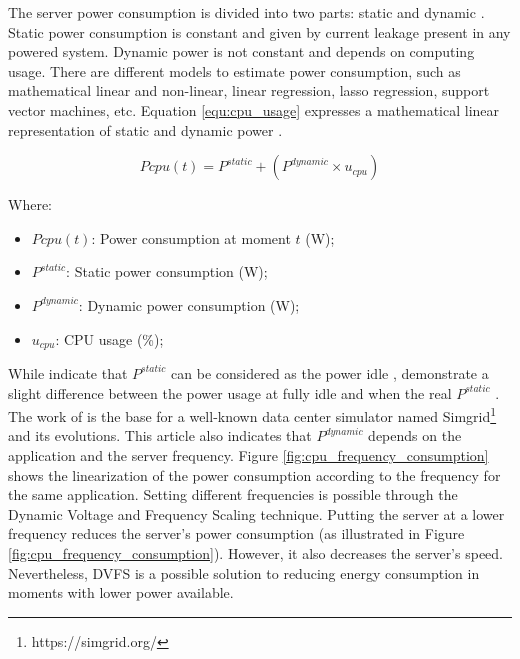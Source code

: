 The server power consumption is divided into two parts: static and dynamic \cite{orgerie2014survey, heinrich2017predicting}. Static power consumption is constant and given by current leakage present in any powered system. Dynamic power is not constant and depends on computing usage. There are different models to estimate power consumption, such as mathematical linear and non-linear, linear regression, lasso regression, support vector machines, etc. Equation \ref{equ:cpu_usage} expresses a mathematical linear representation of static and dynamic power \cite{heinrich2017predicting, ismail2020computing}.

\begin{equation}
    \label{equ:cpu_usage}
    Pcpu(t) = P^{static} + (P^{dynamic} \times u_{cpu})
\end{equation}

Where:
\begin{itemize}
    \item $Pcpu(t)$: Power consumption at moment $t$ (W);
    \item $P^{static}$: Static power consumption (W);
    \item $P^{dynamic}$: Dynamic power consumption (W);
    \item $u_{cpu}$: CPU usage (\%);
\end{itemize}


While \citeauthor{ismail2020computing} indicate that $P^{static}$ can be considered as the power idle \cite{ismail2020computing}, \citeauthor{heinrich2017predicting} demonstrate a slight difference between the power usage at fully idle and when the real $P^{static}$ \cite{heinrich2017predicting}. The work of \citeauthor{heinrich2017predicting} is the base for a well-known data center simulator named Simgrid\footnote{https://simgrid.org/} and its evolutions. This article also indicates that $P^{dynamic}$ depends on the application and the server frequency. Figure \ref{fig:cpu_frequency_consumption} shows the linearization of the power consumption according to the frequency for the same application. Setting different frequencies is possible through the Dynamic Voltage and Frequency Scaling technique. Putting the server at a lower frequency reduces the server's power consumption (as illustrated in Figure \ref{fig:cpu_frequency_consumption}). However, it also decreases the server's speed. Nevertheless, DVFS is a possible solution to reducing energy consumption in moments with lower power available. 


